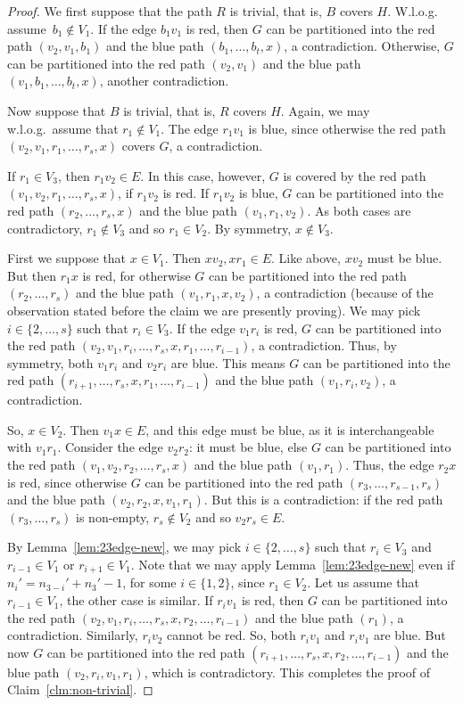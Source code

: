 \documentclass[a4paper,10pt]{article}
\begin{document}
\begin{proof}
We first suppose that the path $R$ is trivial, that is, $B$ covers $H$.
W.l.o.g. assume~$b_1 \notin V_1$.
If the edge $b_1v_1$ is red, then $G$ can be partitioned into the red path $(v_2,v_1,b_1)$ and the blue path $(b_1,\ldots,b_t,x)$, a contradiction.
Otherwise, $G$ can be partitioned into the red path $(v_2,v_1)$ and the blue path $(v_1,b_1,\ldots,b_t,x)$, another contradiction.

Now suppose that $B$ is trivial, that is, $R$ covers $H$.
Again, we may w.l.o.g.~assume that $r_1 \notin V_1$.
The edge $r_1v_1$ is blue, since otherwise  the red path $(v_2,v_1,r_1,\ldots,r_s,x)$ covers $G$, a contradiction.

If $r_1 \in V_3$, then $r_1v_2 \in E$.
In this case, however, $G$ is covered by the red path $(v_1,v_2,r_1,\ldots,r_s,x)$, if $r_1v_2$ is red. 
If $r_1v_2$ is blue, $G$ can be partitioned into the red path $(r_2,\ldots,r_s,x)$ and the blue path $(v_1,r_1,v_2)$.
As both cases are contradictory, $r_1 \notin V_3$ and so $r_1 \in V_2$.
By symmetry, $x \notin V_3$.

First we suppose that $x \in V_1$.
Then $xv_2,xr_1 \in E$.
Like above, $xv_2$ must be blue.
But then $r_1x$ is red, for otherwise $G$ can be partitioned into the red path $(r_2,\ldots,r_{s})$ and the blue path $(v_1,r_1,x,v_2)$, a contradiction (because of the observation stated before the claim we are presently proving).
We may pick $i \in \{2,\ldots,s\}$ such that $r_i \in V_3$.
If the edge $v_1r_i$ is red, $G$ can be partitioned into the red path $(v_2,v_1,r_i,\ldots,r_s,x,r_1,\ldots,r_{i-1})$, a contradiction.
Thus, by symmetry, both $v_1r_i$ and $v_2r_i$ are blue.
This means $G$ can be partitioned into the red path $(r_{i+1},\ldots,r_s,x,r_1,\ldots,r_{i-1})$ and the blue path $(v_1,r_i,v_2)$, a contradiction.

So, $x \in V_2$.
Then $v_1x \in E$, and this edge must be blue, as it is interchangeable with $v_1r_1$.
Consider the edge $v_2r_2$: it must be blue, else $G$ can be partitioned into the red path $(v_1,v_2,r_2,\ldots,r_s,x)$ and the blue path $(v_1,r_1)$.
Thus, the edge $r_2x$ is red, since otherwise $G$ can be partitioned into the red path $(r_3,\ldots,r_{s-1}, r_s)$ and the blue path $(v_2,r_2,x,v_1,r_1)$.
But this is a contradiction: if the red path $(r_3,\ldots,r_{s})$ is non-empty, $r_{s} \notin V_2$ and so $v_2r_{s} \in E$.

By Lemma~\ref{lem:23edge-new}, we may pick $i \in \{2,\ldots,s\}$ such that $r_i \in V_3$ and $r_{i-1} \in V_1$ or $r_{i+1} \in V_1$.
Note that we may apply Lemma~\ref{lem:23edge-new} even if $n_i'=n_{3-i}'+n_3'-1$, for some $i \in \{1,2\}$, since $r_1 \in V_2$.
Let us assume that $r_{i-1} \in V_1$, the other case is similar.
If $r_iv_1$ is red, then $G$ can be partitioned into the red path $(v_2,v_1,r_i,\ldots,r_s,x,r_2,\ldots,r_{i-1})$ and the blue path $(r_1)$, a contradiction.
Similarly, $r_iv_2$ cannot be red.
So, both $r_iv_1$ and $r_iv_1$ are blue.
But now $G$ can be partitioned into the red path $(r_{i+1},\ldots,r_s,x,r_2,\ldots,r_{i-1})$ and the blue path $(v_2,r_i,v_1,r_1)$, which is contradictory.
This completes the proof of Claim~\ref{clm:non-trivial}.
\end{proof}
\end{document}

